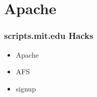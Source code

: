 \section{Apache}
\begin{frame}
  \frametitle{scripts.mit.edu Hacks}
  \begin{itemize}
      \item Apache
      \item AFS
      \item signup
  \end{itemize}
\end{frame}
